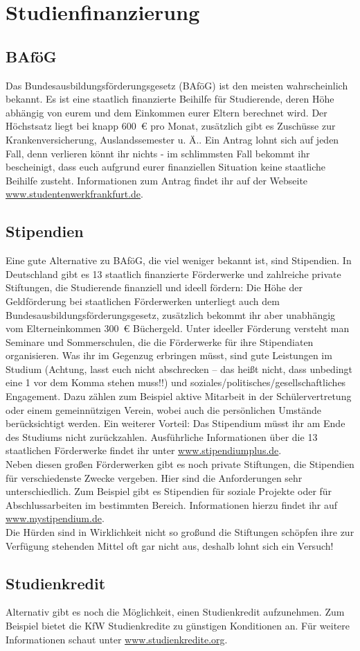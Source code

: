 \section{Studienfinanzierung}
\subsection{BAföG}
Das Bundesausbildungsförderungsgesetz (BAföG) ist den meisten wahrscheinlich bekannt. Es ist eine staatlich finanzierte Beihilfe für Studierende, deren Höhe abhängig von eurem und dem Einkommen eurer Eltern berechnet wird. Der Höchstsatz liegt bei knapp 600~\euro{} pro Monat, zusätzlich gibt es Zuschüsse zur Krankenversicherung, Auslandssemester u. Ä.. Ein Antrag lohnt sich auf jeden Fall, denn verlieren könnt ihr nichts - im schlimmsten Fall bekommt ihr bescheinigt, dass euch aufgrund eurer finanziellen Situation keine staatliche Beihilfe zusteht. Informationen zum Antrag findet ihr auf der Webseite \url{www.studentenwerkfrankfurt.de}.

\subsection{Stipendien}
Eine gute Alternative zu BAföG, die viel weniger bekannt ist, sind Stipendien. In Deutschland gibt es 13 staatlich finanzierte Förderwerke und zahlreiche private Stiftungen, die Studierende finanziell und ideell fördern: Die Höhe der Geldförderung bei staatlichen Förderwerken unterliegt auch dem Bundesausbildungsförderungsgesetz, zusätzlich bekommt ihr aber unabhängig vom Elterneinkommen 300~\euro{} Büchergeld. Unter ideeller Förderung versteht man Seminare und Sommerschulen, die die Förderwerke für ihre Stipendiaten organisieren. Was ihr im Gegenzug erbringen müsst, sind gute Leistungen im Studium (Achtung, lasst euch nicht abschrecken – das hei\ss t nicht, dass unbedingt eine 1 vor dem Komma stehen muss!!) und soziales/politisches/gesellschaftliches Engagement. Dazu zählen zum Beispiel aktive Mitarbeit in der Schülervertretung oder einem gemeinnützigen Verein, wobei auch die persönlichen Umstände berücksichtigt werden. Ein weiterer Vorteil: Das Stipendium müsst ihr am Ende des Studiums nicht zurückzahlen. Ausführliche Informationen über die 13 staatlichen Förderwerke findet ihr unter \url{www.stipendiumplus.de}.\\
Neben diesen gro\ss en Förderwerken gibt es noch private Stiftungen, die Stipendien für verschiedenste Zwecke vergeben. Hier sind die Anforderungen sehr unterschiedlich. Zum Beispiel gibt es Stipendien für soziale Projekte oder für Abschlussarbeiten im bestimmten Bereich. Informationen hierzu findet ihr auf \url{www.mystipendium.de}.\\
Die Hürden sind in Wirklichkeit nicht so gro\ss  und die Stiftungen schöpfen ihre zur Verfügung stehenden Mittel oft gar nicht aus, deshalb lohnt sich ein Versuch!

\subsection{Studienkredit}
Alternativ gibt es noch die Möglichkeit, einen Studienkredit aufzunehmen. Zum Beispiel bietet die KfW Studienkredite zu günstigen Konditionen an. Für weitere Informationen schaut unter \url{www.studienkredite.org}.